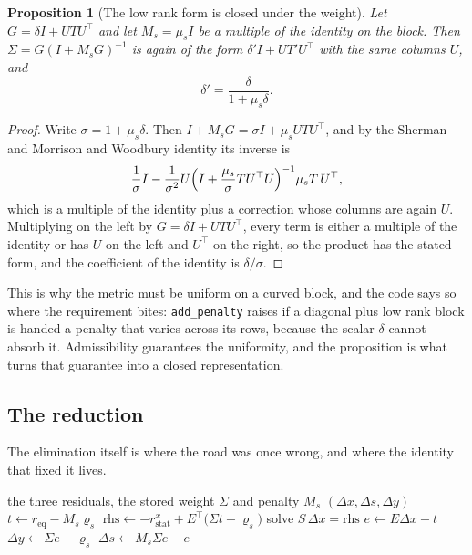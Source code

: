 \documentclass[a4paper,11pt]{book}
\theoremstyle{plain}
\newtheorem{proposition}[theorem]{Proposition}
\theoremstyle{definition}
\theoremstyle{remark}
\numberwithin{equation}{chapter}
\numberwithin{algorithm}{chapter}
\begin{document}
	\begin{proposition}[The low rank form is closed under the weight]
		\label{prop:closedweight}
		Let $G=\delta I+UTU^{\top}$ and let $M_s=\mu_sI$ be a multiple of the
		identity on the block. Then $\Sigma=G(I+M_sG)^{-1}$ is again of the form
		$\delta'I+UT'U^{\top}$ with the same columns $U$, and
		\begin{equation}
			\delta'=\frac{\delta}{1+\mu_s\delta} .
		\end{equation}
	\end{proposition}

	\begin{proof}
		Write $\sigma=1+\mu_s\delta$. Then
		$I+M_sG=\sigma I+\mu_sUTU^{\top}$, and by the
		Sherman and Morrison and Woodbury identity its inverse is
		\[
		\frac1\sigma I-\frac{1}{\sigma^2}U
		\Bigl(I+\frac{\mu_s}{\sigma}TU^{\top}U\Bigr)^{-1}\mu_sT\,U^{\top} ,
		\]
		which is a multiple of the identity plus a correction whose columns are
		again $U$. Multiplying on the left by $G=\delta I+UTU^{\top}$, every term is
		either a multiple of the identity or has $U$ on the left and $U^{\top}$ on
		the right, so the product has the stated form, and the coefficient of the
		identity is $\delta/\sigma$.
	\end{proof}

	This is why the metric must be uniform on a curved block, and the code says so
	where the requirement bites: \texttt{add\_penalty} raises if a diagonal plus
	low rank block is handed a penalty that varies across its rows, because the
	scalar $\delta$ cannot absorb it. Admissibility guarantees the uniformity, and
	the proposition is what turns that guarantee into a closed representation.

	\subsection{The reduction}

	The elimination itself is where the road was once wrong, and where the
	identity that fixed it lives.

	\begin{algorithm}[H]
		\caption{\texttt{reduce}, one solve of the Schur road}
		\begin{algorithmic}[1]
			\Require the three residuals, the stored weight $\Sigma$ and penalty
			$M_s$
			\Ensure $(\Delta x,\Delta s,\Delta y)$
			\State $t\gets r_{\mathrm{eq}}-M_s\varrho_s$
			\State $\text{rhs}\gets-r^{x}_{\mathrm{stat}}
			+E^{\top}\bigl(\Sigma t+\varrho_s\bigr)$
			\State solve $S\,\Delta x=\text{rhs}$
			\State $e\gets E\Delta x-t$
			\State $\Delta y\gets\Sigma e-\varrho_s$
			\State $\Delta s\gets M_s\Sigma e-e$
		\end{algorithmic}
	\end{algorithm}
\end{document}
